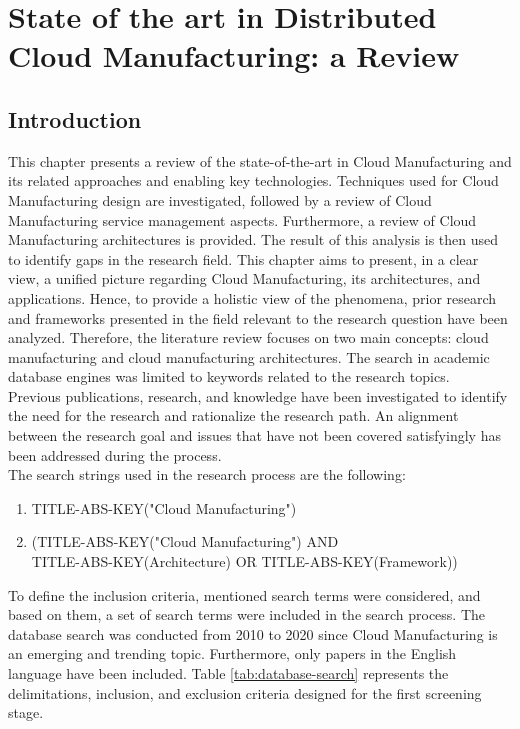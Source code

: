 \chapter{State of the art in Distributed Cloud Manufacturing: a Review}
\label{chapter2}
\section{Introduction}
This chapter presents a review of the state-of-the-art in Cloud Manufacturing and its related approaches and enabling key technologies. Techniques used for Cloud Manufacturing design are investigated, followed by a review of Cloud Manufacturing service management aspects. Furthermore, a review of Cloud Manufacturing architectures is provided. The result of this analysis is then used to identify gaps in the research field. This chapter aims to present, in a clear view, a unified picture regarding Cloud Manufacturing, its architectures, and applications. Hence, to provide a holistic view of the phenomena, prior research and frameworks presented in the field relevant to the research question have been analyzed. Therefore, the literature review focuses on two main concepts: cloud manufacturing and cloud manufacturing architectures. The search in academic database engines was limited to keywords related to the research topics.\\
Previous publications, research, and knowledge have been investigated to identify the need for the research and rationalize the research path. An alignment between the research goal and issues that have not been covered satisfyingly has been addressed during the process.\\
The search strings used in the research process are the following:
\begin{enumerate}
    \item TITLE-ABS-KEY("Cloud Manufacturing")
    \item (TITLE-ABS-KEY("Cloud Manufacturing") AND \\ TITLE-ABS-KEY(Architecture) OR TITLE-ABS-KEY(Framework))
\end{enumerate}
To define the inclusion criteria, mentioned search terms were considered, and based on them, a set of search terms were included in the search process. The database search was conducted from 2010 to 2020 since Cloud Manufacturing is an emerging and trending topic. Furthermore, only papers in the English language have been included. Table \ref{tab:database-search} represents the delimitations, inclusion, and exclusion criteria designed for the first screening stage.\\
